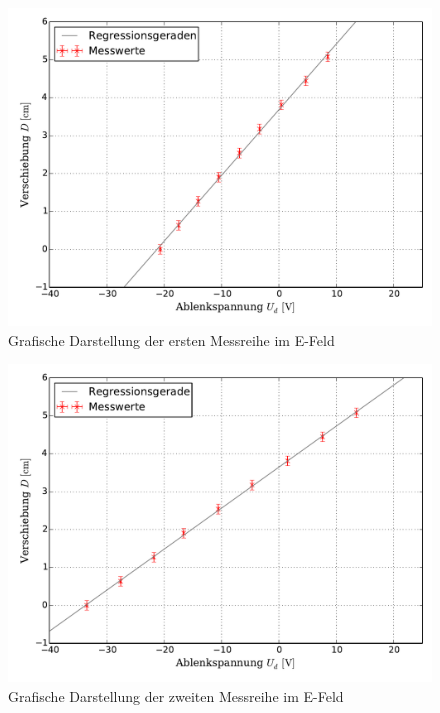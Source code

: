 		
		\begin{figure}[!h]
				\centering
				\includegraphics[scale=0.7]{Grafiken/EFeld_Messreihe_I.pdf}
				\caption{Grafische Darstellung der ersten Messreihe im E-Feld}
				\label{fig:Auswertung_Messdaten_I_I}
		\end{figure}
		
		\begin{figure}[!h]
		\centering
				\includegraphics[scale=0.7]{Grafiken/EFeld_Messreihe_II.pdf}
				\caption{Grafische Darstellung der zweiten Messreihe im E-Feld}\label{fig:Auswertung_Messdaten_I_II}
		\end{figure}
		
